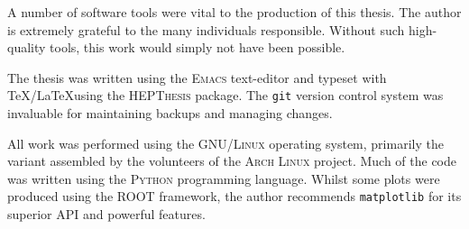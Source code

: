 


\begin{colophon}
  A number of software tools were vital to the production of this thesis. The
  author is extremely grateful to the many individuals responsible. Without
  such high-quality tools, this work would simply not have been possible.

The thesis was written using the \textsc{Emacs} text-editor and typeset with
\TeX/\LaTeX using the \textsc{HEPThesis} package. The \texttt{git} version
control system was invaluable for maintaining backups and managing changes.

All work was performed using the \textsc{GNU/Linux} operating system, primarily
the variant assembled by the volunteers of the \textsc{Arch Linux} project. Much
of the code was written using the \textsc{Python} programming language. Whilst
some plots were produced using the \textsc{ROOT} framework, the author
recommends \texttt{matplotlib} for its superior API and powerful features.

\end{colophon}
